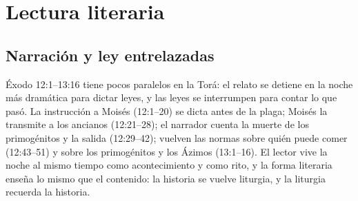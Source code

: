 \documentclass[11pt,letterpaper]{article}
\begin{document}
\section{Lectura literaria}

\subsection{Narración y ley entrelazadas}
Éxodo 12:1--13:16 tiene pocos paralelos en la Torá: el relato se detiene en la noche más dramática para dictar leyes, y las leyes se interrumpen para contar lo que pasó. La instrucción a Moisés (12:1--20) se dicta antes de la plaga; Moisés la transmite a los ancianos (12:21--28); el narrador cuenta la muerte de los primogénitos y la salida (12:29--42); vuelven las normas sobre quién puede comer (12:43--51) y sobre los primogénitos y los Ázimos (13:1--16). El lector vive la noche al mismo tiempo como acontecimiento y como rito, y la forma literaria enseña lo mismo que el contenido: la historia se vuelve liturgia, y la liturgia recuerda la historia.
\end{document}
